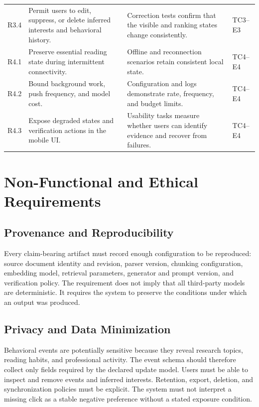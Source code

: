 \begin{longtable}{P{1.0cm}P{4.7cm}P{5.0cm}P{2.8cm}}
R3.4 & Permit users to edit, suppress, or delete inferred interests and behavioral history. & Correction tests confirm that the visible and ranking states change consistently. & TC3--E3 \\
R4.1 & Preserve essential reading state during intermittent connectivity. & Offline and reconnection scenarios retain consistent local state. & TC4--E4 \\
R4.2 & Bound background work, push frequency, and model cost. & Configuration and logs demonstrate rate, frequency, and budget limits. & TC4--E4 \\
R4.3 & Expose degraded states and verification actions in the mobile UI. & Usability tasks measure whether users can identify evidence and recover from failures. & TC4--E4 \\
\bottomrule
\end{longtable}

\section{Non-Functional and Ethical Requirements}

\subsection{Provenance and Reproducibility}

Every claim-bearing artifact must record enough configuration to be reproduced: source document identity and revision, parser version, chunking configuration, embedding model, retrieval parameters, generator and prompt version, and verification policy.
The requirement does not imply that all third-party models are deterministic.
It requires the system to preserve the conditions under which an output was produced.

\subsection{Privacy and Data Minimization}

Behavioral events are potentially sensitive because they reveal research topics, reading habits, and professional activity.
The event schema should therefore collect only fields required by the declared update model.
Users must be able to inspect and remove events and inferred interests.
Retention, export, deletion, and synchronization policies must be explicit.
The system must not interpret a missing click as a stable negative preference without a stated exposure condition.

